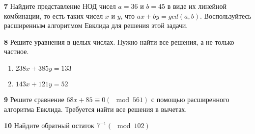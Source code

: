 \documentclass{article}
\begin{document}
\medskip

\textbf{7} Найдите представление НОД чисел $a = 36$ и $b = 45$ в виде их линейной комбинации, то есть таких чисел $x$ и $y$, что $ax + by = gcd(a, b)$. Воспользуйтесь расширенным алгоритмом Евклида для решения этой задачи.

\medskip

\textbf{8} Решите уравнения в целых числах. Нужно найти все решения, а не только частное.

\begin{enumerate}
    \item $238x + 385y = 133$
    \item $143x + 121y = 52$
\end{enumerate}

\medskip

\textbf{9} Решите сравнение $68x + 85 \equiv 0 (\mod 561)$ с помощью расширенного алгоритма Евклида. Требуется найти все решения в вычетах.

\medskip

\textbf{10} Найдите обратный остаток $7^{-1} (\mod 102)$
\end{document}
